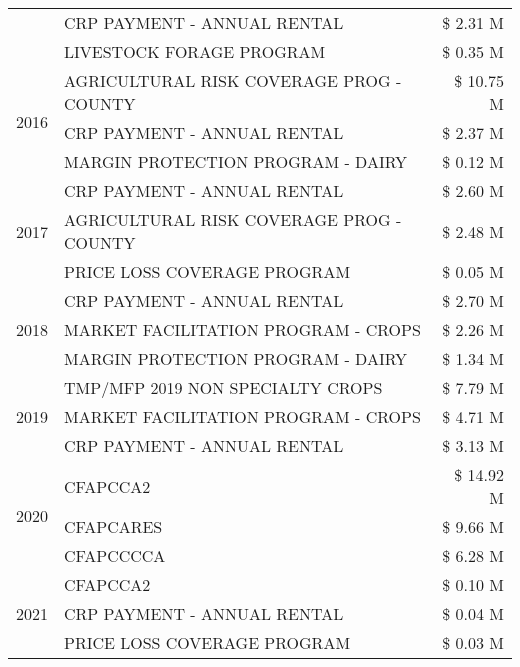 \begin{tabular}{llr}
 & CRP PAYMENT - ANNUAL RENTAL & \$ 2.31 M \\
 & LIVESTOCK FORAGE PROGRAM & \$ 0.35 M \\
\cline{1-3}
\multirow[t]{3}{*}{2016} & AGRICULTURAL RISK COVERAGE PROG - COUNTY & \$ 10.75 M \\
 & CRP PAYMENT - ANNUAL RENTAL & \$ 2.37 M \\
 & MARGIN PROTECTION PROGRAM - DAIRY & \$ 0.12 M \\
\cline{1-3}
\multirow[t]{3}{*}{2017} & CRP PAYMENT - ANNUAL RENTAL & \$ 2.60 M \\
 & AGRICULTURAL RISK COVERAGE PROG - COUNTY & \$ 2.48 M \\
 & PRICE LOSS COVERAGE PROGRAM & \$ 0.05 M \\
\cline{1-3}
\multirow[t]{3}{*}{2018} & CRP PAYMENT - ANNUAL RENTAL & \$ 2.70 M \\
 & MARKET FACILITATION PROGRAM - CROPS & \$ 2.26 M \\
 & MARGIN PROTECTION PROGRAM - DAIRY & \$ 1.34 M \\
\cline{1-3}
\multirow[t]{3}{*}{2019} & TMP/MFP 2019 NON SPECIALTY CROPS & \$ 7.79 M \\
 & MARKET FACILITATION PROGRAM - CROPS & \$ 4.71 M \\
 & CRP PAYMENT - ANNUAL RENTAL & \$ 3.13 M \\
\cline{1-3}
\multirow[t]{3}{*}{2020} & CFAPCCA2 & \$ 14.92 M \\
 & CFAPCARES & \$ 9.66 M \\
 & CFAPCCCCA & \$ 6.28 M \\
\cline{1-3}
\multirow[t]{3}{*}{2021} & CFAPCCA2 & \$ 0.10 M \\
 & CRP PAYMENT - ANNUAL RENTAL & \$ 0.04 M \\
 & PRICE LOSS COVERAGE PROGRAM & \$ 0.03 M \\
\cline{1-3}
\bottomrule
\end{tabular}
